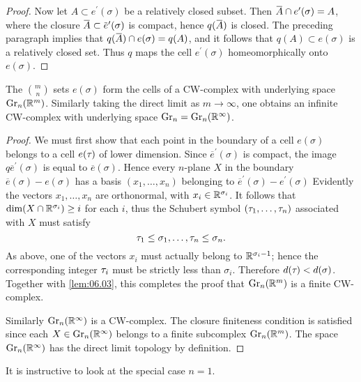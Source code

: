 \documentclass[../main]{subfiles}
\begin{document}
\begin{proof}
Now let $A \subset e^{\prime}(\sigma)$ be a relatively closed subset. Then $\xoverline{A} \cap e^{\prime}(\sigma)=A$, where the closure $\xoverline{A} \subset \xoverline{e}^{\prime}(\sigma)$ is compact, hence $q(\xoverline{A})$ is closed. The preceding paragraph implies that $q(\xoverline{A}) \cap e(\sigma)=q(A)$, and it follows that $q(A) \subset e(\sigma)$ is a relatively closed set. Thus $q$ maps the cell $e^{\prime}(\sigma)$ homeomorphically onto $e(\sigma)$.
\end{proof}

\begin{theorem}
\label{thm:06.04}
The $\binom{m}{n}$ sets $e(\sigma)$ form the cells of a CW-complex with underlying space $\operatorname{Gr}_{n}(\mathbb R^m)$. Similarly taking the direct limit as $m \rightarrow \infty$, one obtains an infinite CW-complex with underlying space $\operatorname{Gr}_{n}=\operatorname{Gr}_{n}(\mathbb R^\infty)$.
\end{theorem}
\begin{proof}
We must first show that each point in the boundary of a cell $e(\sigma)$ belongs to a cell $e(\tau_{})$ of lower dimension. Since $\overline{e}^{\prime}(\sigma)$ is compact, the image $q \overline{e}^{\prime}(\sigma)$ is equal to $\overline{e}(\sigma)$. Hence every $n$-plane $X$ in the boundary $\overline{e}(\sigma)-e(\sigma)$ has a basis $(x_{1},\dots, x_{n})$ belonging to $\overline{e}^{\prime}(\sigma)-e^{\prime}(\sigma)$ Evidently the vectors $x_{1},\dots, x_{n}$ are orthonormal, with $x_{i} \in \mathbb R^{\sigma_{i}}$. It follows that $\dim(X \cap \mathbb R^{\sigma_{i}}) \geq i$ for each $i$, thus the Schubert symbol $(\tau_{1},\dots, \tau_{n})$ associated with $X$ must satisfy
\[
\tau_{1} \leq \sigma_{1},\dots, \tau_{n} \leq \sigma_{n}.
\]
As above, one of the vectors $x_{i}$ must actually belong to $\mathbb R^{\sigma_{i}-1} $; hence the corresponding integer $\tau_{i}$ must be strictly less than $\sigma_{i}$. Therefore $d(\tau_{})<d(\sigma)$. Together with \ref{lem:06.03}, this completes the proof that $\operatorname{Gr}_{n}(\mathbb R^m)$ is a finite CW-complex.
	
Similarly $\operatorname{Gr}_{n}(\mathbb R^\infty)$ is a CW-complex. The closure finiteness condition is satisfied since each $X \in \operatorname{Gr}_{n}(\mathbb R^\infty)$ belongs to a finite subcomplex $\operatorname{Gr}_{n}(\mathbb R^m)$. The space $\operatorname{Gr}_{n}(\mathbb R^\infty)$ has the direct limit topology by definition.
\end{proof}

It is instructive to look at the special case $n=1$.
\end{document}
